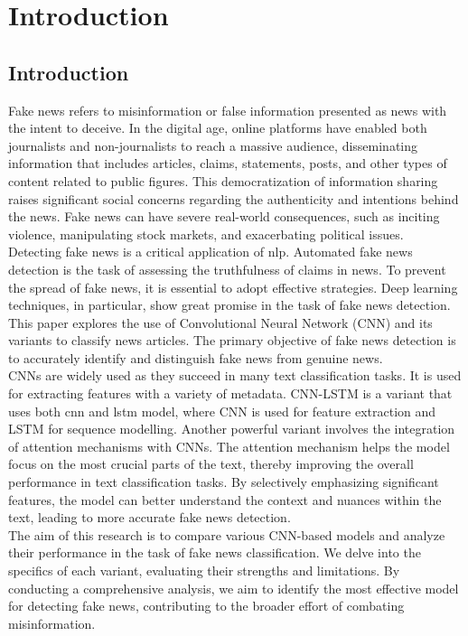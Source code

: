 \chapter{Introduction}

\section{Introduction}

Fake news refers to misinformation or false information presented as news with the intent to deceive. In the digital age, online platforms have enabled both journalists and non-journalists to reach a massive audience, disseminating information that includes articles, claims, statements, posts, and other types of content related to public figures. This democratization of information sharing raises significant social concerns regarding the authenticity and intentions behind the news. Fake news can have severe real-world consequences, such as inciting violence, manipulating stock markets, and exacerbating political issues.\\

Detecting fake news is a critical application of \ac{nlp}. Automated fake news detection is the task of assessing the truthfulness of claims in news.\cite{oshikawa2020survey} To prevent the spread of fake news, it is essential to adopt effective strategies. Deep learning techniques, in particular, show great promise in the task of fake news detection. This paper explores the use of Convolutional Neural Network (CNN) and its variants to classify news articles. The primary objective of fake news detection is to accurately identify and distinguish fake news from genuine news. \\

CNNs are widely used as they succeed in many text classification tasks. It is used for extracting features with a variety of metadata. CNN-LSTM is a variant that uses both \ac{cnn} and \ac{lstm} model, where CNN is used for feature extraction and LSTM for sequence modelling. Another powerful variant involves the integration of attention mechanisms with CNNs. The attention mechanism helps the model focus on the most crucial parts of the text, thereby improving the overall performance in text classification tasks. By selectively emphasizing significant features, the model can better understand the context and nuances within the text, leading to more accurate fake news detection. \\

The aim of this research is to compare various CNN-based models and analyze their performance in the task of fake news classification. We delve into the specifics of each variant, evaluating their strengths and limitations. By conducting a comprehensive analysis, we aim to identify the most effective model for detecting fake news, contributing to the broader effort of combating misinformation.

